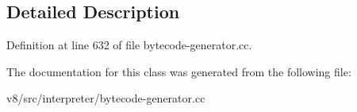 \subsection{Detailed Description}


Definition at line 632 of file bytecode-\/generator.\+cc.



The documentation for this class was generated from the following file\+:\begin{DoxyCompactItemize}
\item 
v8/src/interpreter/bytecode-\/generator.\+cc\end{DoxyCompactItemize}
